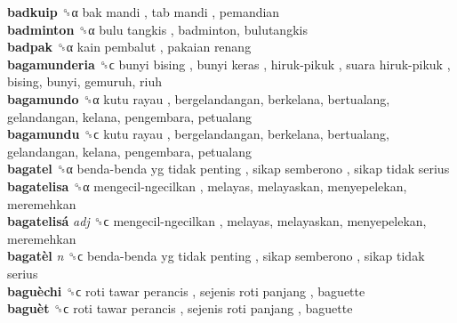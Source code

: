 \textbf{badkuip} ␝α   bak mandi ,  tab mandi , pemandian  \\
\textbf{badminton} ␝α   bulu tangkis , badminton, bulutangkis  \\
\textbf{badpak} ␝α   kain pembalut ,  pakaian renang   \\
\textbf{bagamunderia} ␝ϲ   bunyi bising ,  bunyi keras ,  hiruk-pikuk ,  suara hiruk-pikuk , bising, bunyi, gemuruh, riuh  \\
\textbf{bagamundo} ␝α   kutu rayau , bergelandangan, berkelana, bertualang, gelandangan, kelana, pengembara, petualang  \\
\textbf{bagamundu} ␝ϲ   kutu rayau , bergelandangan, berkelana, bertualang, gelandangan, kelana, pengembara, petualang  \\
\textbf{bagatel} ␝α   benda-benda yg tidak penting ,  sikap semberono ,  sikap tidak serius   \\
\textbf{bagatelisa} ␝α   mengecil-ngecilkan , melayas, melayaskan, menyepelekan, meremehkan  \\
\textbf{bagatelisá} \emph{adj}  ␝ϲ   mengecil-ngecilkan , melayas, melayaskan, menyepelekan, meremehkan  \\
\textbf{bagatèl} \emph{n}  ␝ϲ   benda-benda yg tidak penting ,  sikap semberono ,  sikap tidak serius   \\
\textbf{baguèchi} ␝ϲ   roti tawar perancis ,  sejenis roti panjang , baguette  \\
\textbf{baguèt} ␝ϲ   roti tawar perancis ,  sejenis roti panjang , baguette  \\
